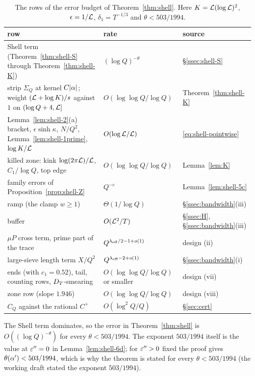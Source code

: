 \begin{table}[ht]\centering\small
\caption{The rows of the error budget of Theorem~\ref{thm:shell}. Here $K=\mathcal L(\log\mathcal L)^2$, $\epsilon=1/\mathcal L$, $\delta_1=T^{-1/3}$ and $\theta<503/1994$.}\label{tab:budget}
\begin{tabular}{@{}>{\raggedright\arraybackslash}p{7.2cm}>{\raggedright\arraybackslash}p{3.8cm}>{\raggedright\arraybackslash}p{3.6cm}@{}}
\toprule
row & rate & source\\
\midrule
Shell term (Theorem~\ref{thm:shell-S} through Theorem~\ref{thm:shell-K}) & $(\log Q)^{-\theta}$ & \S\ref{ssec:shell-S}\\
strip $\Sigma_Q$ at kernel $C\lvert \alpha\rvert$; weight $(\mathcal L+\log K)/s$ against $1$ on $(\log Q+4,\mathcal L]$ & $O(\log\log Q/\log Q)$ & Theorem~\ref{thm:shell-K}\\
Lemma~\ref{lem:shell-2}(a) bracket, $\epsilon\sinh\kappa$, $N/Q^2$, Lemma~\ref{lem:shell-1prime}, $\log K/\mathcal L$ & $O(\log\mathcal L/\mathcal L)$ & \eqref{eq:shell-pointwise}\\
killed zone: kink $\log(2\pi\mathcal L)/\mathcal L$, $C_1/\log Q$, top edge & $O(\log\log Q/\log Q)$ & Lemma~\ref{lem:K}\\
family errors of Proposition~\ref{prop:shell-Z} & $Q^{-c}$ & Lemma~\ref{lem:shell-5c}\\
ramp (the clamp $w\ge1$) & $\Theta(1/\log Q)$ & \S\ref{ssec:bandwidth}(iii)\\
buffer & $O(\mathcal L^2/T)$ & \S\ref{ssec:H}, \S\ref{ssec:bandwidth}(iii)\\
$\mu P$ cross term, prime part of the trace & $Q^{\lambda_{\rm eff}/2-1+o(1)}$ & design (ii)\\
large-sieve length term $X/Q^2$ & $Q^{\lambda_{\rm eff}-2+o(1)}$ & \S\ref{ssec:bandwidth}(i)\\
ends (with $c_1=0.52$), tail, counting rows, $D_T$-smearing & $O(\log\log Q/\log Q)$ or smaller & design (vii)\\
zone row (slope $1.946$) & $O(\log\log Q/\log Q)$ & design (viii)\\
$C_Q$ against the rational $C^+$ & $O(\log^2Q/Q)$ & \S\ref{sec:cert}\\
\bottomrule
\end{tabular}
\end{table}

The Shell term dominates, so the error in Theorem~\ref{thm:shell} is $O((\log Q)^{-\theta})$ for every $\theta<503/1994$. The exponent $503/1994$ itself is the value
at $\varepsilon''=0$ in Lemma~\ref{lem:shell-6d}; for $\varepsilon''>0$ fixed the proof gives $\theta(\alpha')<503/1994$, which is why the theorem is stated for every $\theta<503/1994$
(the working draft stated the exponent $503/1994$).
